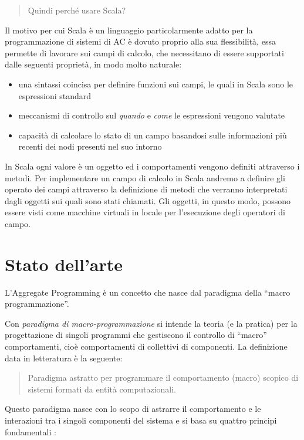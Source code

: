 \documentclass[12pt,a4paper,openright,twoside]{book}
\begin{document}
\begin{quote}
    \centering
    Quindi perché usare Scala?
\end{quote}

Il motivo per cui Scala è un linguaggio particolarmente adatto per la programmazione di sistemi di \ac{AC} è dovuto proprio alla sua flessibilità, essa permette di lavorare sui campi di calcolo, che necessitano di essere supportati dalle seguenti proprietà, in modo molto naturale:

\begin{itemize}
    \item una sintassi coincisa per definire funzioni sui campi, le quali in Scala sono le espressioni standard
    \item meccanismi di controllo sul \textit{quando} e \textit{come} le espressioni vengono valutate
    \item capacità di calcolare lo stato di un campo basandosi sulle informazioni più recenti dei nodi presenti nel suo intorno
\end{itemize}

In Scala ogni valore è un oggetto ed i comportamenti vengono definiti attraverso i metodi. Per implementare un campo di calcolo in Scala andremo a definire gli operato dei campi attraverso la definizione di metodi che verranno interpretati dagli oggetti sui quali sono stati chiamati. Gli oggetti, in questo modo, possono essere visti come macchine virtuali in locale per l'esecuzione degli operatori di campo.

\section{Stato dell'arte}

L'Aggregate Programming è un concetto che nasce dal paradigma della ``macro programmazione''.

Con \textit{paradigma di macro-programmazione} si intende la teoria (e la pratica) per la progettazione di singoli programmi che gestiscono il controllo di ``macro'' comportamenti, cioè comportamenti di collettivi di componenti. La definizione data in letteratura è  la seguente:

\begin{quote}
    Paradigma astratto per programmare il comportamento (macro) scopico di sistemi formati da entità computazionali. \cite{Casadei2023}
\end{quote}

Questo paradigma nasce con lo scopo di astrarre il comportamento e le interazioni tra i singoli componenti del sistema e si basa su quattro principi fondamentali \cite{Casadei2023}:
\end{document}
